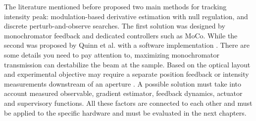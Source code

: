 The literature mentioned before proposed two main methods for tracking intensity peak: modulation-based derivative estimation with null regulation, and discrete perturb-and-observe searches.
The first solution was designed by monochromator feedback and dedicated controllers such as MoCo.
While the second was proposed by Quinn et al. with a software implementation 
\cite{Proux2006,Stoupin2010,MoCo2008,Quinn2021}.
There are some details you need to pay attention to, maximizing monochromator transmission can destabilize the beam at the sample.
Based on the optical layout and experimental objective may require a separate position feedback or intensity measurements downstream of an aperture \cite{vanSilfhout2014,Zohar2016,Quinn2021}.
A possible solution must take into account measured observable, gradient estimator, feedback dynamics, actuator and supervisory functions.
All these factors are connected to each other and must be applied to the specific hardware and must be evaluated in the next chapters.